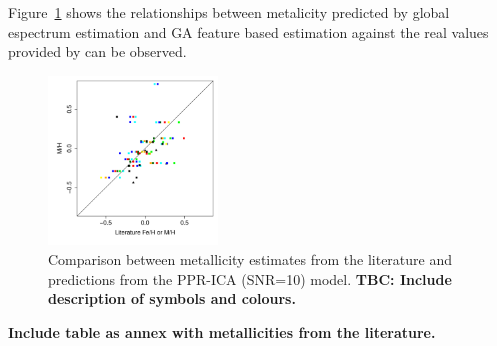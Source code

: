  Figure~\ref{M_ICA_10} shows the relationships between metalicity
 predicted by global espectrum estimation and GA feature based
 estimation against the real values provided by
 \cite{2013A&A...549A.129C} can be observed.

 \begin {figure}
  \centering
   \includegraphics[width=0.4\textwidth]{figs/irtf-figs/M-ICA10.pdf}
   \caption{Comparison between metallicity estimates from the
     literature and predictions from the PPR-ICA (SNR=10) model. {\bf
       TBC: Include description of symbols and colours.}}
  \label{M_ICA_10}
 \end {figure}

 {\bf Include table as annex with metallicities from the literature.}
